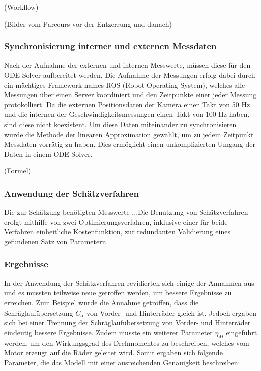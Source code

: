 (Workflow)    

(Bilder vom Parcours vor der Entzerrung und danach)

\subsubsection{Synchronisierung interner und externen Messdaten}
Nach der Aufnahme der externen und internen Messwerte, müssen diese für den ODE-Solver aufbereitet werden. Die Aufnahme der Messungen erfolg dabei durch ein mächtiges Framework names ROS (Robot Operating System), welches alle Messungen über einen Server koordiniert und den Zeitpunkte einer jeder Messung protokolliert. Da die externen Positionsdaten der Kamera einen Takt von 50 Hz und die internen der Geschwindigkeitsmessungen einen Takt von 100 Hz haben, sind diese nicht koexistent. Um diese Daten miteinander zu synchronisieren wurde die Methode der linearen Approximation gewählt, um zu jedem Zeitpunkt Messdaten vorrätig zu haben. Dies ermöglicht einen unkomplizierten Umgang der Daten in einem ODE-Solver. 

(Formel)

\subsubsection{Anwendung der Schätzverfahren}
Die zur Schätzung benötigten Messwerte ...Die Benutzung von Schätzverfahren erolgt mithilfe von zwei Optimierungsverfahren, inklusive einer für beide Verfahren einheitliche Kostenfunktion, zur redundanten Validierung eines gefundenen Satz von Parametern.  

\subsubsection{Ergebnisse}
In der Anwendung der Schätzverfahren revidierten sich einige der Annahmen aus \cite{VikAnd} und es mussten teilweise neue getroffen werden, um bessere Ergebnisse zu erreichen. Zum Beispiel wurde die Annahme getroffen, dass die Schräglaufübersetzung $C_{\alpha}$ von Vorder- und Hinterräder gleich ist. Jedoch ergaben sich bei einer Trennung der Schräglaufübersetzung von Vorder- und Hinterräder eindeutig bessere Ergebnisse. Zudem musste ein weiterer Parameter $\eta_M$ eingeführt werden, um den Wirkungsgrad des Drehmomentes zu beschreiben, welches vom Motor erzeugt auf die Räder geleitet wird. Somit ergaben sich folgende Parameter, die das Modell mit einer ausreichenden Genauigkeit beschreiben: 


